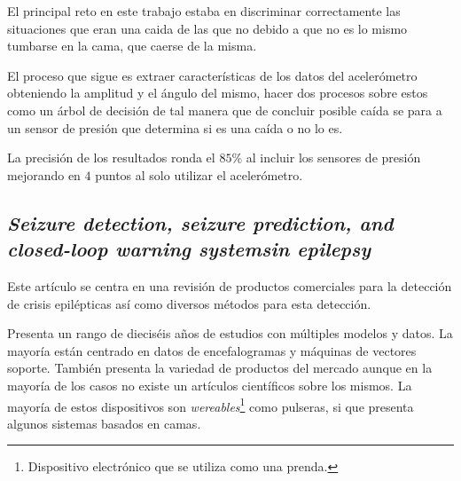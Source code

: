El principal reto en este trabajo estaba en discriminar correctamente las situaciones que eran una caida de las que no debido a que no es lo mismo tumbarse en la cama, que caerse de la misma. 

El proceso que sigue es extraer características de los datos del acelerómetro obteniendo la amplitud y el ángulo del mismo, hacer dos procesos sobre estos como un árbol de decisión de tal manera que de concluir posible caída se para a un sensor de presión que determina si es una caída o no lo es.

La precisión de los resultados ronda el $85\%$ al incluir los sensores de presión mejorando en $4$ puntos al solo utilizar el acelerómetro.

\subsection{\textit{\textbf{Seizure detection, seizure prediction, and closed-loop warning systemsin epilepsy}}~\cite{ramgopal2014product_review}}

Este artículo se centra en una revisión de productos comerciales para la detección de crisis epilépticas así como diversos métodos para esta detección.

Presenta un rango de dieciséis años de estudios con múltiples modelos y datos. La mayoría están centrado en datos de encefalogramas y máquinas de vectores soporte. También presenta la variedad de productos del mercado aunque en la mayoría de los casos no existe un artículos científicos sobre los mismos. La mayoría de estos dispositivos son \textit{wereables}\footnote{Dispositivo electrónico que se utiliza como una prenda.} como pulseras, si que presenta algunos sistemas basados en camas.